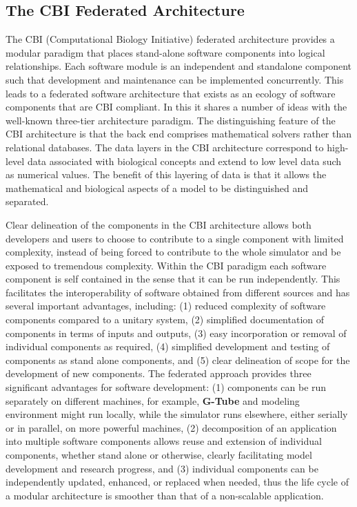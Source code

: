 \documentclass[12pt]{article}
\begin{document}
\subsection{The CBI Federated Architecture}
The CBI (Computational Biology Initiative) federated architecture
provides a modular paradigm that places stand-alone software
components into logical relationships. Each software module is an independent and standalone component such that development and maintenance can be implemented concurrently. This leads to a federated software architecture that exists as an ecology of software components that are CBI compliant. In this it shares a number of
ideas with the well-known three-tier architecture paradigm.  The
distinguishing feature of the CBI architecture is that the back end
comprises mathematical solvers rather than relational databases.  The
data layers in the CBI architecture correspond to high-level data
associated with biological concepts and extend to low level data such
as numerical values. The benefit of this layering of data is that it
allows the mathematical and biological aspects of a model to be
distinguished and separated.

Clear delineation of the components in the CBI architecture allows both
developers and users to choose to contribute to a single component
with limited complexity, instead of being forced to contribute to the
whole simulator and be exposed to tremendous complexity. Within the
CBI paradigm each software component is self contained in the sense
that it can be run independently. This facilitates the
interoperability of software obtained from different sources and has
several important advantages, including: (1) reduced complexity of
software components compared to a unitary system, (2) simplified
documentation of components in terms of inputs and outputs, (3) easy
incorporation or removal of individual components as required, (4)
simplified development and testing of components as stand alone
components, and (5) clear delineation of scope for the development of new
components. The federated approach provides three significant advantages
for software development: (1) components can be run separately on
different machines, for example, {\bf G-Tube} and modeling environment
might run locally, while the simulator runs elsewhere, either serially
or in parallel, on more powerful machines, (2) decomposition of an
application into multiple software components allows reuse and
extension of individual components, whether stand alone or otherwise,
clearly facilitating model development and research progress, and (3)
individual components can be independently updated, enhanced, or
replaced when needed, thus the life cycle of a modular architecture is
smoother than that of a non-scalable application.
\end{document}
